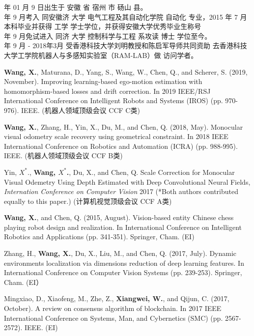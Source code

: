  年 01 月 9 日出生于 安徽 省 宿州 市 砀山 县。\\
 年 9 月考入 同安徽济 大学 电气工程及其自动化学院 自动化 专业，2015 年 7 月本科毕业并获得 工学 学士学位，并获得安徽大学优秀毕业生称号\\
 年 9 月免试进入 同济 大学 控制科学与工程 系攻读 博士 学位至今。\\
 年 9 月 - 2018年3月 受香港科技大学刘明教授和陈启军导师共同资助 去香港科技大学工学院机器人与多感知实验室（RAM-LAB）做 访问学者。

\begin{enumerate}[{[}1{]}]
\item \textbf{Wang, X.}, Maturana, D., Yang, S., Wang, W., Chen, Q., and Scherer, S. (2019, November).
 Improving learning-based ego-motion estimation with homomorphism-based losses and drift correction. 
 In 2019 IEEE/RSJ International Conference on Intelligent Robots and Systems (IROS) (pp. 970-976). IEEE. (机器人领域顶级会议 CCF C类)
\item \textbf{Wang, X.}, Zhang, H., Yin, X., Du, M., and Chen, Q. (2018, May). 
Monocular visual odometry scale recovery using geometrical constraint. 
In 2018 IEEE International Conference on Robotics and Automation (ICRA) (pp. 988-995). IEEE. (机器人领域顶级会议 CCF B类)
\item Yin, $X^*$., {\bf Wang, $X^*$.}, Du, X., and Chen, Q. 
Scale Correction for Monocular Visual Odemetry Using Depth Estimated with Deep Convolutional Neural Fields,
\emph{Internation Conference on Computer Vision} 2017 (*Both authors contributed equally to this paper.)
 (计算机视觉顶级会议 CCF A类)
\item \textbf{Wang, X.}, and Chen, Q. (2015, August).
 Vision-based entity Chinese chess playing robot design and realization. 
 In International Conference on Intelligent Robotics and Applications (pp. 341-351). Springer, Cham. (EI)
 \item Zhang, H., \textbf{Wang, X.}, Du, X., Liu, M., and Chen, Q. (2017, July). 
 Dynamic environments localization via dimensions reduction of deep learning features.
  In International Conference on Computer Vision Systems (pp. 239-253). Springer, Cham. (EI）
\item Mingxiao, D., Xiaofeng, M., Zhe, Z., \textbf{Xiangwei, W.}, and Qijun, C. (2017, October).
 A review on consensus algorithm of blockchain. 
 In 2017 IEEE International Conference on Systems, Man, and Cybernetics (SMC) (pp. 2567-2572). IEEE. (EI)
\end{enumerate}

